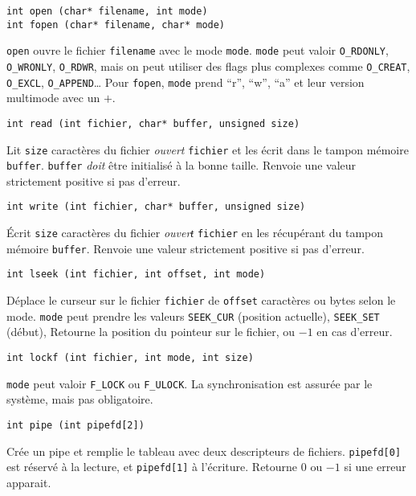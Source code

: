 \documentclass[a4paper]{article}
\begin{document}
\begin{multicols*}{2}
    \begin{lstlisting}
int open (char* filename, int mode)
int fopen (char* filename, char* mode)
    \end{lstlisting}
    \texttt{open} ouvre le fichier \texttt{filename} avec le mode \texttt{mode}. \texttt{mode} peut valoir \texttt{O\_RDONLY}, \texttt{O\_WRONLY}, \texttt{O\_RDWR}, mais on peut utiliser des flags plus complexes comme \texttt{O\_CREAT}, \texttt{O\_EXCL}, \texttt{O\_APPEND}\ldots
    Pour \texttt{fopen}, \texttt{mode} prend ``r'', ``w'', ``a'' et leur version multimode avec un $+$.

    \begin{lstlisting}
int read (int fichier, char* buffer, unsigned size)
    \end{lstlisting}
    Lit \texttt{size} caractères du fichier \emph{ouvert} \texttt{fichier} et les écrit dans le tampon mémoire \texttt{buffer}.
    \texttt{buffer} \emph{doit} être initialisé à la bonne taille. 
    Renvoie une valeur strictement positive si pas d'erreur.

    \begin{lstlisting}
int write (int fichier, char* buffer, unsigned size)
    \end{lstlisting}
    \'Ecrit \texttt{size} caractères du fichier \emph{ouverŧ} \texttt{fichier} en les récupérant du tampon mémoire \texttt{buffer}.
    Renvoie une valeur strictement positive si pas d'erreur.

    \begin{lstlisting}
int lseek (int fichier, int offset, int mode)
    \end{lstlisting}
    D\'eplace le curseur sur le fichier \texttt{fichier} de \texttt{offset} caractères ou bytes selon le mode.
    \texttt{mode} peut prendre les valeurs \texttt{SEEK\_CUR} (position actuelle), \texttt{SEEK\_SET} (début),
    Retourne la position du pointeur sur le fichier, ou $-1$ en cas d'erreur.

    \begin{lstlisting}
int lockf (int fichier, int mode, int size)
    \end{lstlisting}
    \texttt{mode} peut valoir \texttt{F\_LOCK} ou \texttt{F\_ULOCK}.
    La synchronisation est assurée par le système, mais pas obligatoire.

\begin{lstlisting}
int pipe (int pipefd[2])
\end{lstlisting}

Crée un pipe et remplie le tableau avec deux descripteurs de fichiers. \texttt{pipefd[0]} est réservé à la lecture, et \texttt{pipefd[1]} à l'écriture.
Retourne $0$ ou $-1$ si une erreur apparait.


\end{multicols*}
\end{document}
